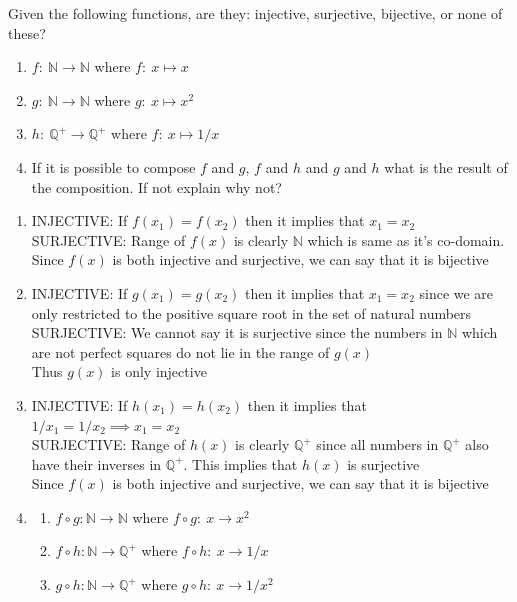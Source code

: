 \documentclass[12pt]{article}
\newcommand{\N}{\mathbb{N}}
\newcommand{\Q}{\mathbb{Q}}
\newenvironment{solution}[2][Solution]{ \begin{trivlist}
\item[\hskip \labelsep {\bfseries #1}]}{\end{trivlist}}
\newenvironment{problem}[2][Problem]{\begin{trivlist}
\item[\hskip \labelsep {\bfseries #1}\hskip \labelsep {\bfseries #2.}]}{\end{trivlist}}
\begin{document}
\begin{problem}{5}Given the following functions, are they: injective, surjective, bijective, or none of these?
\item[]
\begin{enumerate}[label=\alph*)]
    \item $ f \colon \ \N \longrightarrow \N$ where
    $ f \colon \ x \mapsto x$
    \item $ g \colon \ \N \longrightarrow \N$ where
    $ g \colon \ x \mapsto x^2$
    \item $h \colon \ \Q^+ \longrightarrow \Q^+$ where
    $ f \colon \ x \mapsto 1/x$
    \item If it is possible to compose $f$ and $g$, $f$ and $h$ and $g$ and $h$ what is the result of the composition. If not explain why not?
\end{enumerate}
\end{problem}
\begin{solution}{5}
\item[]
\begin{enumerate}[label=\alph*)]
    \item
    INJECTIVE:
        If $f(x_1) = f(x_2)$ then it implies that $x_1 = x_2$\\
    SURJECTIVE:
        Range of $f(x)$ is clearly $\N$ which is same as it's co-domain.\\
    Since $f(x)$ is both injective and surjective, we can say that it is bijective
    \item 
    INJECTIVE:
        If $g(x_1) = g(x_2)$ then it implies that $x_1 = x_2$ since we are only restricted to the positive square root in the set of natural numbers \\
    SURJECTIVE: We cannot say it is surjective since the numbers in $\N$ which are not perfect squares do not lie in the range of $g(x)$ \\
    Thus $g(x)$ is only injective
    \item 
    INJECTIVE:
        If $h(x_1) = h(x_2)$ then it implies that $1/x_1 = 1/x_2 \implies x_1 = x_2$\\
    SURJECTIVE:
        Range of $h(x)$ is clearly $\Q^+$ since all numbers in $\Q^+$ also have their inverses in $\Q^+$. This implies that $h(x)$ is surjective\\
    Since $f(x)$ is both injective and surjective, we can say that it is bijective 
    \item 
    \begin{enumerate}[label=(\roman*)]
        \item $f \circ g \colon \N \longrightarrow \N$ where $ f \circ g \colon \ x \longrightarrow x^2$
        \item $f \circ h \colon \N \longrightarrow \Q^+$ where $ f \circ h \colon \ x \longrightarrow 1/x$
        \item $g \circ h \colon \N \longrightarrow \Q^+$ where $ g \circ h \colon \ x \longrightarrow 1/x^2$
    \end{enumerate}
\end{enumerate}
\end{solution}
\end{document}
